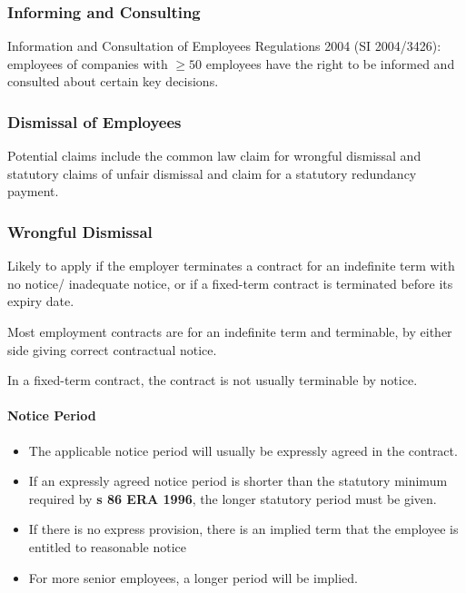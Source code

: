 \documentclass[
]{article}
\providecommand{\tightlist}{%
  \setlength{\itemsep}{0pt}\setlength{\parskip}{0pt}}
\begin{document}
\hypertarget{informing-and-consulting}{%
\subsubsection{Informing and
Consulting}\label{informing-and-consulting}}

Information and Consultation of Employees Regulations 2004 (SI
2004/3426): employees of companies with \(\geq 50\) employees have the
right to be informed and consulted about certain key decisions.

\hypertarget{dismissal-of-employees}{%
\subsubsection{Dismissal of Employees}\label{dismissal-of-employees}}

Potential claims include the common law claim for wrongful dismissal and
statutory claims of unfair dismissal and claim for a statutory
redundancy payment.

\hypertarget{wrongful-dismissal}{%
\subsubsection{Wrongful Dismissal}\label{wrongful-dismissal}}

Likely to apply if the employer terminates a contract for an indefinite
term with no notice/ inadequate notice, or if a fixed-term contract is
terminated before its expiry date.

Most employment contracts are for an indefinite term and terminable, by
either side giving correct contractual notice.

In a fixed-term contract, the contract is not usually terminable by
notice.

\hypertarget{notice-period}{%
\paragraph{Notice Period}\label{notice-period}}

\begin{itemize}
\tightlist
\item
  The applicable notice period will usually be expressly agreed in the
  contract.
\item
  If an expressly agreed notice period is shorter than the statutory
  minimum required by \textbf{s 86 ERA 1996}, the longer statutory
  period must be given.
\item
  If there is no express provision, there is an implied term that the
  employee is entitled to reasonable notice
\item
  For more senior employees, a longer period will be implied.
\end{itemize}
\end{document}
